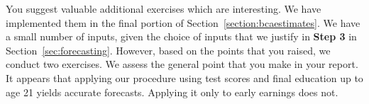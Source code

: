 You suggest valuable additional exercises which are interesting. We have implemented them in the final portion of Section~\ref{section:bcaestimates}. We have a small number of inputs, given the choice of inputs that we justify in \textbf{Step 3} in Section~\ref{sec:forecasting}. However, based on the points that you raised, we conduct two exercises. We assess the general point that you make in your report. It appears that applying our procedure using test scores and final education up to age 21 yields accurate forecasts. Applying it only to  early earnings does not.


